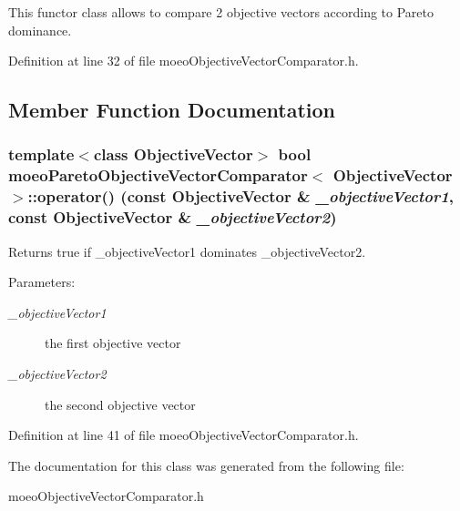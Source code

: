 This functor class allows to compare 2 objective vectors according to Pareto dominance. 



Definition at line 32 of file moeo\-Objective\-Vector\-Comparator.h.

\subsection{Member Function Documentation}
\subsubsection{\setlength{\rightskip}{0pt plus 5cm}template$<$class Objective\-Vector$>$ bool {\bf moeo\-Pareto\-Objective\-Vector\-Comparator}$<$ Objective\-Vector $>$::operator() (const Objective\-Vector \& {\em \_\-objective\-Vector1}, const Objective\-Vector \& {\em \_\-objective\-Vector2})\hspace{0.3cm}{\tt  [inline]}}\label{classmoeoParetoObjectiveVectorComparator_6bcb86968704748ce98d370a1306b22c}


Returns true if \_\-objective\-Vector1 dominates \_\-objective\-Vector2. 

\begin{Desc}
\item[Parameters:]
\begin{description}
\item[{\em \_\-objective\-Vector1}]the first objective vector \item[{\em \_\-objective\-Vector2}]the second objective vector \end{description}
\end{Desc}


Definition at line 41 of file moeo\-Objective\-Vector\-Comparator.h.

The documentation for this class was generated from the following file:\begin{CompactItemize}
\item 
moeo\-Objective\-Vector\-Comparator.h\end{CompactItemize}
